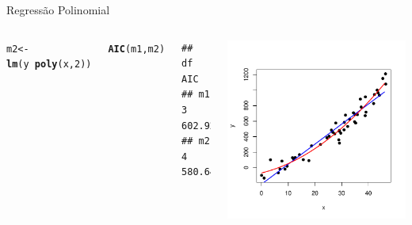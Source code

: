 \documentclass{beamer}\usepackage[]{graphicx}\usepackage[]{color}
\makeatletter
\newcommand{\hlnum}[1]{\textcolor[rgb]{0.686,0.059,0.569}{#1}}%
\newcommand{\hlopt}[1]{\textcolor[rgb]{0,0,0}{#1}}%
\newcommand{\hlstd}[1]{\textcolor[rgb]{0.345,0.345,0.345}{#1}}%
\newcommand{\hlkwb}[1]{\textcolor[rgb]{0.69,0.353,0.396}{#1}}%
\newcommand{\hlkwd}[1]{\textcolor[rgb]{0.737,0.353,0.396}{\textbf{#1}}}%
\newenvironment{kframe}{%
 \def\at@end@of@kframe{}%
 \ifinner\ifhmode%
  \def\at@end@of@kframe{\end{minipage}}%
  \begin{minipage}{\columnwidth}%
 \fi\fi%
 \def\FrameCommand##1{\hskip\@totalleftmargin \hskip-\fboxsep
 \colorbox{shadecolor}{##1}\hskip-\fboxsep
     \hskip-\linewidth \hskip-\@totalleftmargin \hskip\columnwidth}%
 \MakeFramed {\advance\hsize-\width
   \@totalleftmargin\z@ \linewidth\hsize
   \@setminipage}}%
 {\par\unskip\endMakeFramed%
 \at@end@of@kframe}
\newenvironment{knitrout}{}{} %
\renewenvironment{knitrout}{\setlength{\topsep}{0mm}}{}
\makeatother
\begin{document}
\begin{frame}[fragile]{Regressão Polinomial}

\begin{columns}

\setlength{\topsep}{2pt}

\begin{knitrout}\tiny
{}\color{fgcolor}\begin{kframe}
\begin{alltt}
\hlstd{m2} \hlkwb{<-} \hlkwd{lm}\hlstd{(y} \hlopt{~} \hlkwd{poly}\hlstd{(x,}\hlnum{2}\hlstd{))}

\hlkwd{AIC}\hlstd{(m1,m2)}
\end{alltt}
\begin{verbatim}
##    df      AIC
## m1  3 602.9227
## m2  4 580.6495
\end{verbatim}
\end{kframe}
\end{knitrout}


\begin{knitrout}
\color{fgcolor}
\includegraphics[width=1\linewidth]{figure/samppolallplot2-1} 

\end{knitrout}

\end{columns}

\end{frame}
\end{document}
